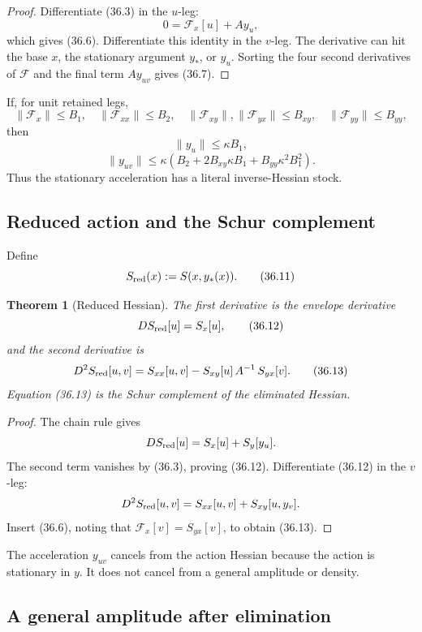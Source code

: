 \documentclass[11pt]{article}
\newtheorem{theorem}{Theorem}[section]
\begin{document}
\begin{proof}
Differentiate (36.3) in the \(u\)-leg:
\[
 0=\mathcal F_x[u]+A y_u,
\]
which gives (36.6).  Differentiate this identity in the \(v\)-leg.
The derivative can hit the base \(x\), the stationary argument \(y_*\),
or \(y_u\).  Sorting the four second derivatives of \(\mathcal F\) and
the final term \(Ay_{uv}\) gives (36.7).
\end{proof}

If, for unit retained legs,
\[
 \|\mathcal F_x\|\leq B_1,\quad
 \|\mathcal F_{xx}\|\leq B_2,\quad
 \|\mathcal F_{xy}\|,\|\mathcal F_{yx}\|\leq B_{xy},\quad
 \|\mathcal F_{yy}\|\leq B_{yy},
 \tag{36.8}
\]
then
\[
 \|y_u\|\leq\kappa B_1,
 \tag{36.9}
\]
\[
 \|y_{uv}\|
 \leq
 \kappa\left(
 B_2+2B_{xy}\kappa B_1+B_{yy}\kappa^2B_1^2
 \right).
 \tag{36.10}
\]
Thus the stationary acceleration has a literal inverse-Hessian stock.

\subsection{Reduced action and the Schur complement}

Define
\[
 S_{\rm red}(x):=S(x,y_*(x)).
 \tag{36.11}
\]

\begin{theorem}[Reduced Hessian]
\label{thm:v11v36-schur}
The first derivative is the envelope derivative
\[
 D S_{\rm red}[u]=S_x[u],
 \tag{36.12}
\]
and the second derivative is
\[
 D^2S_{\rm red}[u,v]
 =
 S_{xx}[u,v]
 -
 S_{xy}[u]\,
 A^{-1}\,
 S_{yx}[v].
 \tag{36.13}
\]
Equation (36.13) is the Schur complement of the eliminated Hessian.
\end{theorem}

\begin{proof}
The chain rule gives
\[
 D S_{\rm red}[u]=S_x[u]+S_y[y_u].
\]
The second term vanishes by (36.3), proving (36.12).  Differentiate
(36.12) in the \(v\)-leg:
\[
 D^2S_{\rm red}[u,v]
 =
 S_{xx}[u,v]+S_{xy}[u,y_v].
\]
Insert (36.6), noting that
\(\mathcal F_x[v]=S_{yx}[v]\), to obtain (36.13).
\end{proof}

The acceleration \(y_{uv}\) cancels from the action Hessian because the
action is stationary in \(y\).  It does not cancel from a general
amplitude or density.

\subsection{A general amplitude after elimination}
\end{document}

